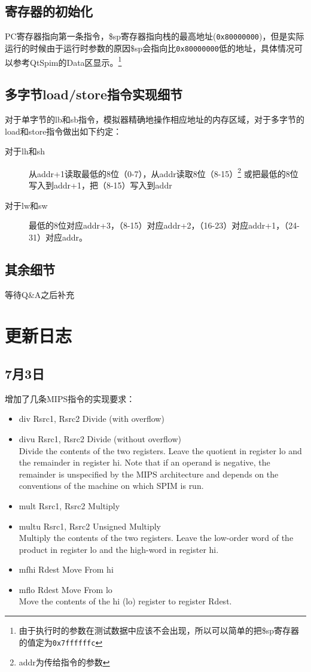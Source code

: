 \documentclass[a4paper, 11pt]{article}
\begin{document}
\subsection{寄存器的初始化}
	PC寄存器指向第一条指令，\$sp寄存器指向栈的最高地址(\texttt{0x80000000})，但是实际运行的时候由于运行时参数的原因\$sp会指向比\texttt{0x80000000}低的地址，具体情况可以参考QtSpim的Data区显示。\footnote{由于执行时的参数在测试数据中应该不会出现，所以可以简单的把\$sp寄存器的值定为\texttt{0x7ffffffc}}
\subsection{多字节load/store指令实现细节}
	对于单字节的lb和sb指令，模拟器精确地操作相应地址的内存区域，对于多字节的load和store指令做出如下约定：
	\begin{description}
		\item [对于lh和sh] 从addr+1读取最低的8位（0-7），从addr读取8位（8-15）\footnote{addr为传给指令的参数} 或把最低的8位写入到addr+1，把（8-15）写入到addr
		\item [对于lw和sw] 最低的8位对应addr+3，（8-15）对应addr+2，（16-23）对应addr+1，（24-31）对应addr。
	\end{description}
\subsection{其余细节}
	等待Q\&A之后补充
	
\section{更新日志}
\subsection{7月3日}
	增加了几条MIPS指令的实现要求：
	\begin{itemize}
		\item div Rsrc1, Rsrc2	\hfill Divide (with overflow)
		\item divu Rsrc1, Rsrc2	\hfill Divide (without overflow)\\
			Divide the contents of the two registers. Leave the quotient in register lo and the remainder in register hi. Note that if an operand is negative, the remainder is unspecified by the MIPS architecture and depends on the conventions of the machine on which SPIM is run.
		\item mult Rsrc1, Rsrc2	\hfill Multiply
		\item multu Rsrc1, Rsrc2	\hfill Unsigned Multiply\\
			Multiply the contents of the two registers. Leave the low-order word of the product in register lo and the high-word in register hi.
		\item mfhi Rdest	\hfill Move From hi 
		\item mflo Rdest	\hfill Move From lo \\
			Move the contents of the hi (lo) register to register Rdest.
	\end{itemize}
\end{document}
